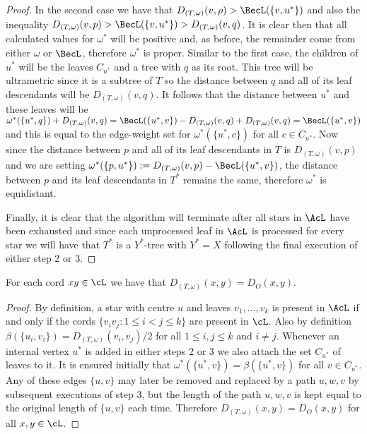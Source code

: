 \begin{proof}
  In the second case we have that $D_{(T,\omega)}(v,\rho) > \BecL(\{v,u^*\})$
  and also the inequality $D_{(T,\omega)}(v,p) > \BecL(\{v,u^*\}) >
  D_{(T,\omega)}(v,q)$.  It is clear then that all calculated values for
  $\omega^*$ will be positive and, as before, the remainder come from either
  $\omega$ or $\BecL$, therefore $\omega^*$ is proper.  Similar to the first
  case, the children of $u^*$ will be the leaves $C_{u^*}$ and a tree with $q$
  as its root.  This tree will be ultrametric since it is a subtree of $T$ so
  the distance between $q$ and all of its leaf descendants will be
  $D_{(T,\omega)}(v,q)$.  It follows that the distance between $u^*$ and these
  leaves will be $\omega^*(\{u^*,q\}) + D_{(T,\omega)}(v,q) = \BecL(\{u^*,v\})
  - D_{(T,\omega)}(v,q) + D_{(T,\omega)}(v,q) = \BecL(\{u^*,v\})$ and this is
  equal to the edge-weight set for $\omega^*(\{u^*,c\})$ for all $c \in
  C_{u^*}$.  Now since the distance between $p$ and all of its leaf
  descendants in $T$ is $D_{(T,\omega)}(v,p)$ and we are setting
  $\omega^*(\{p,u^*\}) := D_{(T,\omega)}(v,p) - \BecL(\{u^*,v\})$, the
  distance between $p$ and its leaf descendants in $T^*$ remains the same,
  therefore $\omega^*$ is equidistant.

  Finally, it is clear that the algorithm will terminate after all stars in
  $\AcL$ have been exhausted and since each unprocessed leaf in $\AcL$ is
  processed for every star we will have that $T^*$ is a $Y^*$-tree with $Y^* =
  X$ following the final execution of either step 2 or 3.
\end{proof}

\begin{lem}
  \label{lem:t-t-star-equal-dists}
  For each cord $xy \in \cL$ we have that $D_{(T,\omega)}(x,y) = D_O(x,y)$.
\end{lem}

\begin{proof}
  By definition, a star with centre $u$ and leaves $v_1,\dotsc,v_k$ is present
  in $\AcL$ if and only if the cords $\{v_iv_j \colon 1 \leq i < j \leq k\}$
  are present in $\cL$.  Also by definition $\beta(\{u_i,v_i\}) =
  D_{(T,\omega)}(v_i,v_j)/2$ for all $1 \leq i,j \leq k$ and $i \neq j$.
  Whenever an internal vertex $u^*$ is added in either steps 2 or 3 we also
  attach the set $C_{u^*}$ of leaves to it.  It is ensured initially that
  $\omega^*(\{u^*,v\}) = \beta(\{u^*,v\})$ for all $v \in C_{u^*}$.  Any of
  these edges $\{u,v\}$ may later be removed and replaced by a path $u,w,v$ by
  subsequent executions of step 3, but the length of the path $u,w,v$ is kept
  equal to the original length of $\{u,v\}$ each time.  Therefore
  $D_{(T,\omega)}(x,y) = D_O(x,y)$ for all $x,y \in \cL$.
\end{proof}

